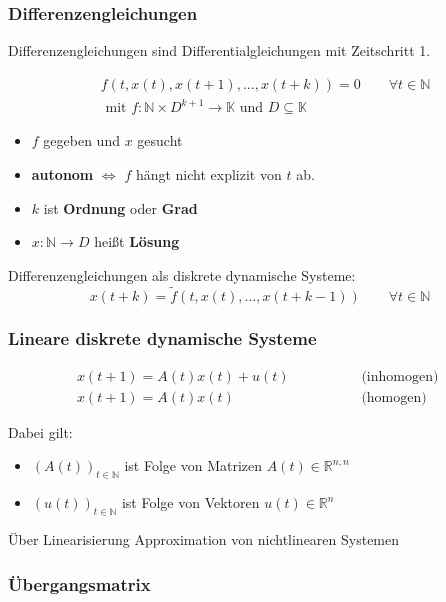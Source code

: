 \documentclass[a4paper]{article}
\newcommand{\R}{\mathbb{R}}
\newcommand{\N}{\mathbb{N}}
\begin{document}
\subsubsection{Differenzengleichungen}
Differenzengleichungen sind Differentialgleichungen
mit Zeitschritt 1.

\begin{align*}
	& f(t, x(t), x(t+1), ..., x(t+k)) = 0 \qquad
	\forall t \in \mathbb{N} \\
	& \text{ mit } f: \N \times D^{k+1} \rightarrow \mathbb{K}
	\text{ und } D \subseteq \mathbb{K}
\end{align*}

\begin{itemize}
	\item $f$ gegeben und $x$ gesucht
	\item \textbf{autonom} $\Leftrightarrow$ 
		$f$ hängt nicht explizit von $t$ ab.
	\item $k$ ist \textbf{Ordnung} oder \textbf{Grad} 
	\item $x: \N \rightarrow D$ heißt \textbf{Lösung}
\end{itemize}

Differenzengleichungen als diskrete dynamische Systeme:
\[
	x(t+k) = \tilde{f} \left(
		t, x(t), ..., x(t+k-1)
	\right) \qquad
	\forall t \in \mathbb{N} 
\] 

\subsubsection{Lineare diskrete dynamische Systeme}

\begin{align*}
	x(t+1) = A(t) x(t) + u(t)
	\qquad \qquad & \text{ (inhomogen) } \\
	x(t+1) = A(t) x(t)
	\qquad \qquad & \text{ (homogen) }
\end{align*}

Dabei gilt:

\begin{itemize}
	\item $(A(t))_{t \in \mathbb{N}}$
		ist Folge von Matrizen $A(t) \in \R ^{n, n}$
	\item $(u(t))_{t \in \mathbb{N}}$ ist Folge von Vektoren 
		$u(t) \in \R ^{n}$
\end{itemize}

Über Linearisierung Approximation von nichtlinearen Systemen
\\

\subsubsection{Übergangsmatrix}
\end{document}

